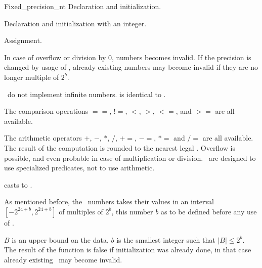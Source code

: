 \begin{ccClass}{Fixed_precision_nt}
            {Declaration and initialization.}


            {Declaration and initialization with an integer.}

\ccOperations


        {Assignment. 
}

{In case of overflow or division by 0, numbers becomes invalid.
If the precision is changed by usage of 
, already existing numbers may become invalid
if they are no longer multiple of $2^b$.}

{ \ccClassName\ do not implement infinite numbers. 
   is identical to .}

The comparison operations $==$, $!=$, $<$, $>$, $<=$, and $>=$ are all
available.

The arithmetic operators $+$, $-$, $*$, $/$, $+=$, $-=$, $*=$ and $/=$
are all available. The result of the computation is rounded to the
nearest legal \ccClassName. Overflow is possible, and even probable in case
of multiplication or division. \ccClassName\ are designed to use
specialized predicates, not to use arithmetic.


         {casts to .}



As mentioned before, the \ccClassName\ numbers takes their values in an
interval $[-2^{24+b},2^{24+b}]$ of multiples of $2^b$,
this number $b$ as to be defined before any
 use of .


{$B$ is an upper bound on the data, $b$ is the smallest integer such that 
$|B|\leq 2^b$. The result of the function is false if initialization was
already done, in that case already existing \ccClassName\ may become invalid.}


\end{ccClass}
